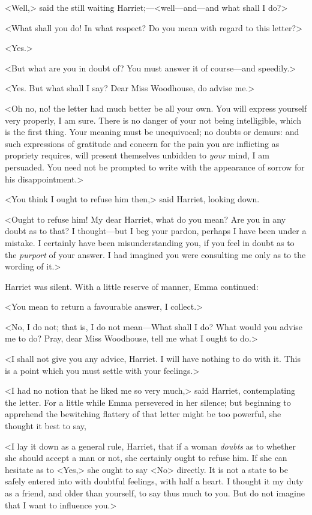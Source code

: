 <Well,> said the still waiting Harriet;—<well—and—and what shall I do?>

<What shall you do! In what respect? Do you mean with regard to this letter?>

<Yes.>

<But what are you in doubt of? You must answer it of course—and speedily.>

<Yes. But what shall I say? Dear Miss Woodhouse, do advise me.>

<Oh no, no! the letter had much better be all your own. You will express yourself very properly, I am sure. There is no danger of your not being intelligible, which is the first thing. Your meaning must be unequivocal; no doubts or demurs: and such expressions of gratitude and concern for the pain you are inflicting as propriety requires, will present themselves unbidden to \textit{your} mind, I am persuaded. You need not be prompted to write with the appearance of sorrow for his disappointment.>

<You think I ought to refuse him then,> said Harriet, looking down.

<Ought to refuse him! My dear Harriet, what do you mean? Are you in any doubt as to that? I thought—but I beg your pardon, perhaps I have been under a mistake. I certainly have been misunderstanding you, if you feel in doubt as to the \textit{purport} of your answer. I had imagined you were consulting me only as to the wording of it.>

Harriet was silent. With a little reserve of manner, Emma continued:

<You mean to return a favourable answer, I collect.>

<No, I do not; that is, I do not mean—What shall I do? What would you advise me to do? Pray, dear Miss Woodhouse, tell me what I ought to do.>

<I shall not give you any advice, Harriet. I will have nothing to do with it. This is a point which you must settle with your feelings.>

<I had no notion that he liked me so very much,> said Harriet, contemplating the letter. For a little while Emma persevered in her silence; but beginning to apprehend the bewitching flattery of that letter might be too powerful, she thought it best to say,

<I lay it down as a general rule, Harriet, that if a woman \textit{doubts} as to whether she should accept a man or not, she certainly ought to refuse him. If she can hesitate as to <Yes,> she ought to say <No> directly. It is not a state to be safely entered into with doubtful feelings, with half a heart. I thought it my duty as a friend, and older than yourself, to say thus much to you. But do not imagine that I want to influence you.>

